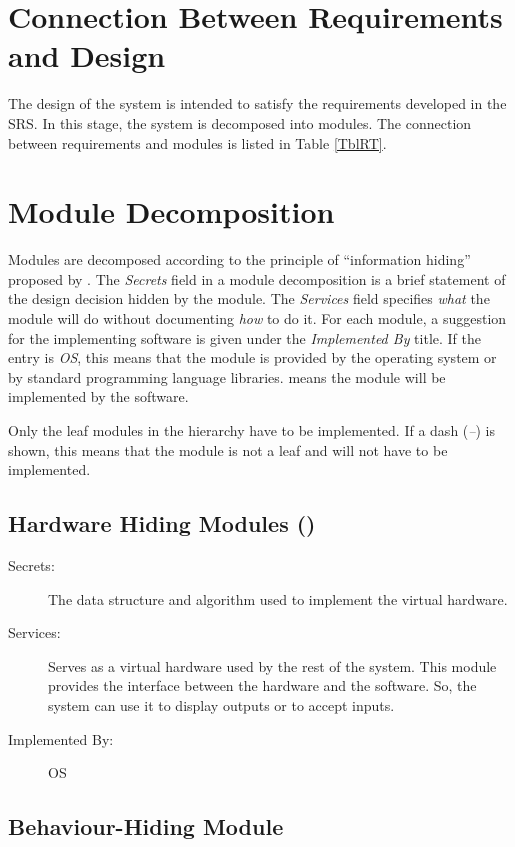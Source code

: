 \documentclass[12pt, titlepage]{article}
\begin{document}
\section{Connection Between Requirements and Design} \label{SecConnection}

The design of the system is intended to satisfy the requirements developed in
the SRS. In this stage, the system is decomposed into modules. The connection
between requirements and modules is listed in Table \ref{TblRT}.

\section{Module Decomposition} \label{SecMD}

Modules are decomposed according to the principle of ``information hiding''
proposed by \citet{ParnasEtAl1984}. The \emph{Secrets} field in a module
decomposition is a brief statement of the design decision hidden by the
module. The \emph{Services} field specifies \emph{what} the module will do
without documenting \emph{how} to do it. For each module, a suggestion for the
implementing software is given under the \emph{Implemented By} title. If the
entry is \emph{OS}, this means that the module is provided by the operating
system or by standard programming language libraries. \emph{\progname{}} means
the
module will be implemented by the \progname{} software.

Only the leaf modules in the hierarchy have to be implemented. If a dash
(\emph{--}) is shown, this means that the module is not a leaf and will not
have to be implemented.

\subsection{Hardware Hiding Modules ()}

\begin{description}
\item[Secrets:]The data structure and algorithm used to implement the virtual
  hardware.
\item[Services:]Serves as a virtual hardware used by the rest of the
  system. This module provides the interface between the hardware and the
  software. So, the system can use it to display outputs or to accept inputs.
\item[Implemented By:] OS
\end{description}

\subsection{Behaviour-Hiding Module}
\end{document}
